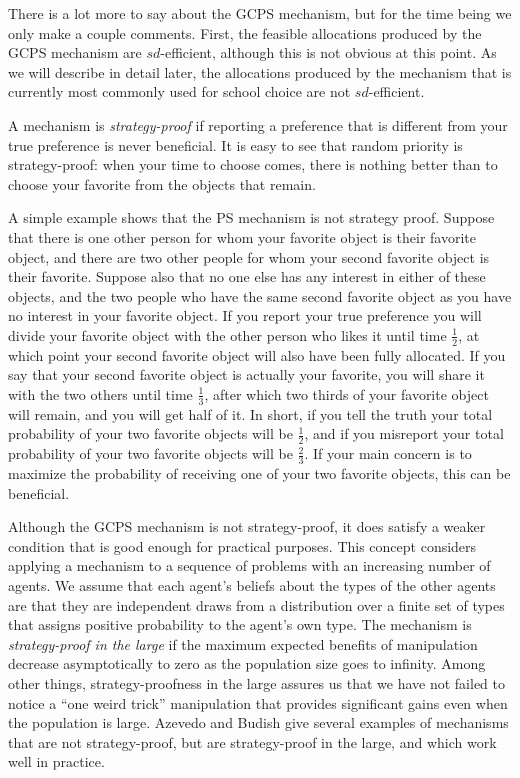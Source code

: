 \documentclass[12pt]{article}
\theoremstyle{definition}
\begin{document}
There is a lot more to say about the GCPS mechanism, but for the time
being we only make a couple comments.  First, the feasible allocations
produced by the GCPS mechanism are $sd$-efficient, although this is
not obvious at this point.  As we will describe in detail later, the
allocations produced by the mechanism that is currently most commonly
used for school choice are not $sd$-efficient.

A mechanism is \emph{strategy-proof} if reporting a preference that is
different from your true preference is never beneficial.  It is easy
to see that random priority is strategy-proof: when your time to
choose comes, there is nothing better than to choose your favorite
from the objects that remain.

A simple example shows that the PS mechanism is not strategy proof.
Suppose that there is one other person for whom your favorite object
is their favorite object, and there are two other people for whom your
second favorite object is their favorite.  Suppose also that no one
else has any interest in either of these objects, and the two people
who have the same second favorite object as you have no interest in
your favorite object.  If you report your true preference you will
divide your favorite object with the other person who likes it until
time $\tfrac12$, at which point your second favorite object will also
have been fully allocated.  If you say that your second favorite
object is actually your favorite, you will share it with the two
others until time $\tfrac13$, after which two thirds of your favorite
object will remain, and you will get half of it.  In short, if you
tell the truth your total probability of your two favorite objects
will be $\tfrac12$, and if you misreport your total probability of
your two favorite objects will be $\tfrac23$.  If your main concern is
to maximize the probability of receiving one of your two favorite
objects, this can be beneficial.

Although the GCPS mechanism is not strategy-proof, it does satisfy a
weaker condition that is good enough for practical purposes.  This
concept considers applying a mechanism to a sequence of problems with
an increasing number of agents.  We assume that each agent's beliefs
about the types of the other agents are that they are independent
draws from a distribution over a finite set of types that assigns
positive probability to the agent's own type.  The mechanism is
\emph{strategy-proof in the large} \citep{ab19res} if the maximum
expected benefits of manipulation decrease asymptotically to zero as
the population size goes to infinity.  Among other things,
strategy-proofness in the large assures us that we have not failed to
notice a ``one weird trick'' manipulation that provides significant
gains even when the population is large.  Azevedo and Budish give
several examples of mechanisms that are not strategy-proof, but are
strategy-proof in the large, and which work well in practice.
\end{document}
